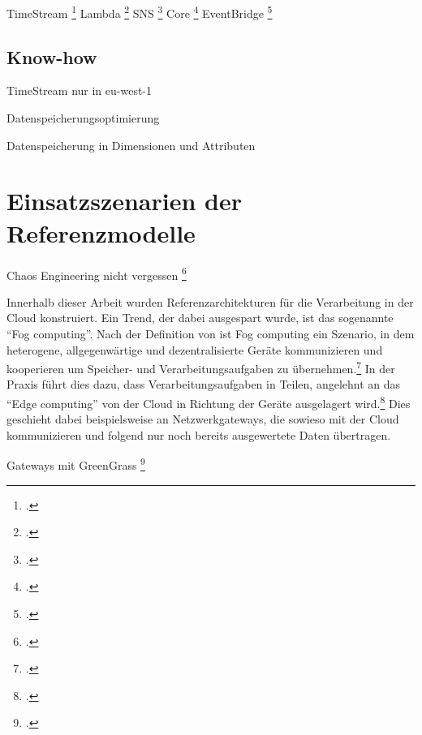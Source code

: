 TimeStream \footcite[Vgl.][]{AmazonWebServicesInc..o.J.be}
Lambda \footcite[Vgl.][]{AmazonWebServicesInc..o.J.bf}
\ac{SNS} \footcite[Vgl.][]{AmazonWebServicesInc..o.J.bc}
\AWSIOT{} Core \footcite[Vgl.][]{AmazonWebServicesInc..o.J.az}
EventBridge \footcite[Vgl.][]{AmazonWebServicesInc..o.J.bl}

\subsection{Know-how}
TimeStream nur in eu-west-1

Datenspeicherungsoptimierung

Datenspeicherung in Dimensionen und Attributen


\section{Einsatzszenarien der Referenzmodelle}


Chaos Engineering nicht vergessen \footcite[Vgl.][]{Augsten.2020}

Innerhalb dieser Arbeit wurden Referenzarchitekturen für die Verarbeitung in der Cloud konstruiert. Ein Trend, der dabei ausgespart wurde, ist das sogenannte \enquote{Fog computing}. Nach der Definition von \citeauthor{Vaquero.2014} ist Fog computing ein Szenario, in dem heterogene, allgegenwärtige und dezentralisierte Geräte kommunizieren und kooperieren um Speicher- und Verarbeitungsaufgaben zu übernehmen.\footcite[Vgl.][30\psq]{Vaquero.2014} In der Praxis führt dies dazu, dass Verarbeitungsaufgaben in Teilen, angelehnt an das \enquote{Edge computing} von der Cloud in Richtung der Geräte ausgelagert wird.\footcite[Vgl.][]{Bonomi.2012} Dies geschieht dabei beispielsweise an Netzwerkgateways, die sowieso mit der Cloud kommunizieren und folgend nur noch bereits ausgewertete Daten übertragen.

Gateways mit GreenGrass \footcite[][]{Shankar.2020}